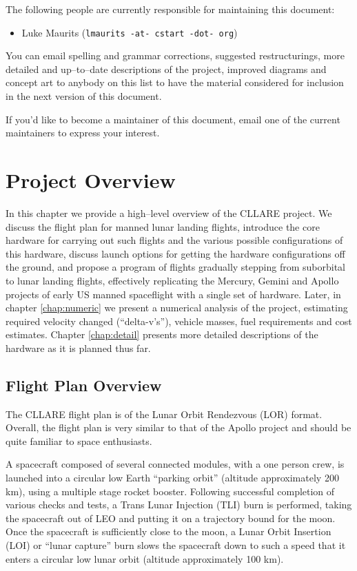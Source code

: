 \documentclass{report}
\begin{document}
The following people are currently responsible for maintaining this document:
\begin{itemize}
\item Luke Maurits (\texttt{lmaurits -at- cstart -dot- org})
\end{itemize}
You can email spelling and grammar corrections, suggested restructurings, more detailed and up--to--date descriptions of the project, improved diagrams and concept art to anybody on this list to have the material considered for inclusion in the next version of this document.

If you'd like to become a maintainer of this document, email one of the current maintainers to express your interest.


\chapter{Project Overview}

In this chapter we provide a high--level overview of the CLLARE project.  We discuss the flight plan for manned lunar landing flights, introduce the core hardware for carrying out such flights and the various possible configurations of this hardware, discuss launch options for getting the hardware configurations off the ground, and propose a program of flights gradually stepping from suborbital to lunar landing flights, effectively replicating the Mercury, Gemini and Apollo projects of early US manned spaceflight with a single set of hardware.  Later, in chapter \ref{chap:numeric} we present a numerical analysis of the project, estimating required velocity changed (``delta-v's''), vehicle masses, fuel requirements and cost estimates.  Chapter \ref{chap:detail} presents more detailed descriptions of the hardware as it is planned thus far.

\section{Flight Plan Overview} \label{sec:flightplan}

The CLLARE flight plan is of the Lunar Orbit Rendezvous (LOR) format.  Overall, the flight plan is very similar to that of the Apollo project and should be quite familiar to space enthusiasts.

A spacecraft composed of several connected modules, with a one person crew, is launched into a circular low Earth ``parking orbit'' (altitude approximately 200 km), using a multiple stage rocket booster.  Following successful completion of various checks and tests, a Trans Lunar Injection (TLI) burn is performed, taking the spacecraft out of LEO and putting it on a trajectory bound for the moon.  Once the spacecraft is sufficiently close to the moon, a Lunar Orbit Insertion (LOI) or ``lunar capture'' burn slows the spacecraft down to such a speed that it enters a circular low lunar orbit (altitude approximately 100 km).
\end{document}
